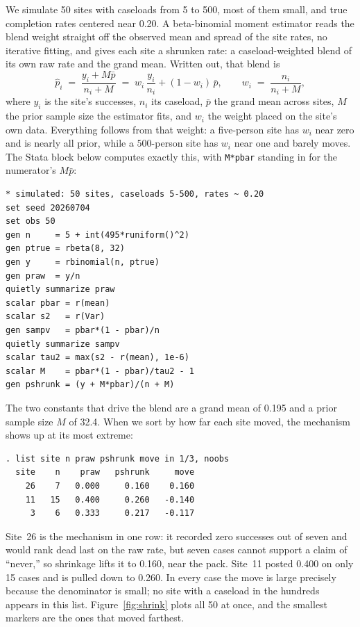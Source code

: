 We simulate 50 sites with caseloads from 5 to 500, most of them small, and true completion rates centered near 0.20. A beta-binomial moment estimator reads the blend weight straight off the observed mean and spread of the site rates, no iterative fitting, and gives each site a shrunken rate: a caseload-weighted blend of its own raw rate and the grand mean. Written out, that blend is
\begin{equation}
  \hat p_i \;=\; \frac{y_i + M\bar p}{n_i + M}
           \;=\; w_i\,\frac{y_i}{n_i} + (1-w_i)\,\bar p,
  \qquad
  w_i \;=\; \frac{n_i}{n_i + M},
  \label{eq:ch07-viz-shrink}
\end{equation}
where $y_i$ is the site's successes, $n_i$ its caseload, $\bar p$ the grand mean across sites, $M$ the prior sample size the estimator fits, and $w_i$ the weight placed on the site's own data. Everything follows from that weight: a five-person site has $w_i$ near zero and is nearly all prior, while a $500$-person site has $w_i$ near one and barely moves. The Stata block below computes exactly this, with \texttt{M*pbar} standing in for the numerator's $M\bar p$:
\par
{\footnotesize
\begin{verbatim}
* simulated: 50 sites, caseloads 5-500, rates ~ 0.20
set seed 20260704
set obs 50
gen n     = 5 + int(495*runiform()^2)
gen ptrue = rbeta(8, 32)
gen y     = rbinomial(n, ptrue)
gen praw  = y/n
quietly summarize praw
scalar pbar = r(mean)
scalar s2   = r(Var)
gen sampv   = pbar*(1 - pbar)/n
quietly summarize sampv
scalar tau2 = max(s2 - r(mean), 1e-6)
scalar M    = pbar*(1 - pbar)/tau2 - 1
gen pshrunk = (y + M*pbar)/(n + M)
\end{verbatim}
}
The two constants that drive the blend are a grand mean of 0.195 and a prior sample size $M$ of 32.4. When we sort by how far each site moved, the mechanism shows up at its most extreme:
\par
{\footnotesize
\begin{verbatim}
. list site n praw pshrunk move in 1/3, noobs
  site    n    praw   pshrunk     move
    26    7   0.000     0.160    0.160
    11   15   0.400     0.260   -0.140
     3    6   0.333     0.217   -0.117
\end{verbatim}
}
Site~26 is the mechanism in one row: it recorded zero successes out of seven and would rank dead last on the raw rate, but seven cases cannot support a claim of \enquote{never,} so shrinkage lifts it to 0.160, near the pack. Site~11 posted 0.400 on only 15 cases and is pulled down to 0.260. In every case the move is large precisely because the denominator is small; no site with a caseload in the hundreds appears in this list. Figure~\ref{fig:shrink} plots all 50 at once, and the smallest markers are the ones that moved farthest.

